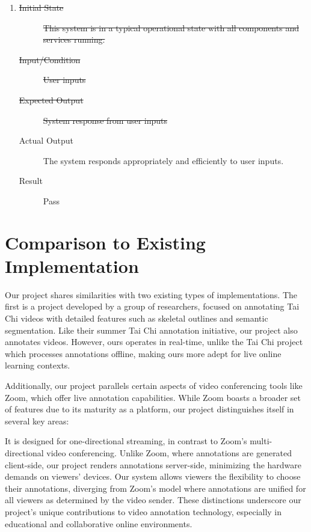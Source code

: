 \documentclass[12pt, titlepage]{article}
\begin{document}
\begin{enumerate}[NFR-T1]
\begin{description}
    \end{description}
  \item \label{NFRT30}
    \begin{description}
    \item[\sout{Initial State}]\sout{ This system is in a typical operational state with all
      components and services running.
    }\item[\sout{Input/Condition}]\sout{ User inputs
    }\item[\sout{Expected Output}]\sout{ System response from user inputs
    }\item[Actual Output] The system responds appropriately and efficiently to user
      inputs.
    \item[Result] Pass
    \end{description}
  \end{enumerate}

\section{Comparison to Existing Implementation}

Our project shares similarities with two existing types of implementations. The
first is a project developed by a group of researchers, focused on annotating
Tai Chi videos with detailed features such as skeletal outlines and semantic
segmentation. Like their summer Tai Chi annotation initiative, our project also
annotates videos. However, ours operates in real-time, unlike the Tai Chi
project which processes annotations offline, making ours more adept for live
online learning contexts.

Additionally, our project parallels certain aspects of video conferencing tools
like Zoom, which offer live annotation capabilities. While Zoom boasts a broader
set of features due to its maturity as a platform, our project distinguishes
itself in several key areas:

It is designed for one-directional streaming, in contrast to Zoom's
multi-directional video conferencing. Unlike Zoom, where annotations are
generated client-side, our project renders annotations server-side, minimizing
the hardware demands on viewers' devices. Our system allows viewers the
flexibility to choose their annotations, diverging from Zoom's model where
annotations are unified for all viewers as determined by the video sender. These
distinctions underscore our project's unique contributions to video annotation
technology, especially in educational and collaborative online environments.
\end{document}
